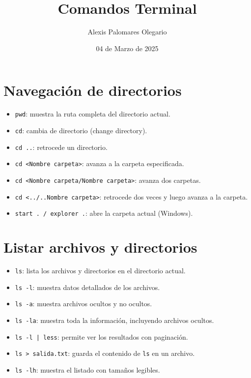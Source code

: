 \documentclass{article}
\title{Comandos Terminal}
\author{Alexis Palomares Olegario}
\date{04 de Marzo de 2025}
\begin{document}
\maketitle


\section{Navegación de directorios}
\begin{itemize}
    \item \texttt{pwd}: muestra la ruta completa del directorio actual.
    \item \texttt{cd}: cambia de directorio (change directory).
    \item \texttt{cd ..}: retrocede un directorio.
    \item \texttt{cd <Nombre carpeta>}: avanza a la carpeta especificada.
    \item \texttt{cd <Nombre carpeta/Nombre carpeta>}: avanza dos carpetas.
    \item \texttt{cd <../..Nombre carpeta>}: retrocede dos veces y luego avanza a la carpeta.
    \item \texttt{start . / explorer .}: abre la carpeta actual (Windows).
\end{itemize}

\section{Listar archivos y directorios}
\begin{itemize}
    \item \texttt{ls}: lista los archivos y directorios en el directorio actual.
    \item \texttt{ls -l}: muestra datos detallados de los archivos.
    \item \texttt{ls -a}: muestra archivos ocultos y no ocultos.
    \item \texttt{ls -la}: muestra toda la información, incluyendo archivos ocultos.
    \item \texttt{ls -l | less}: permite ver los resultados con paginación.
    \item \texttt{ls > salida.txt}: guarda el contenido de \texttt{ls} en un archivo.
    \item \texttt{ls -lh}: muestra el listado con tamaños legibles.
\end{itemize}
\end{document}
